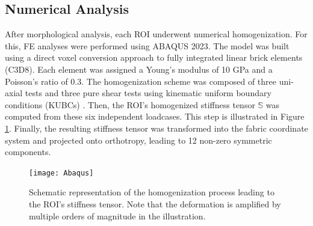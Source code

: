 \documentclass[a4paper,fleqn]{DC_ArtStyle}
\begin{document}
	\subsection{Numerical Analysis}
	After morphological analysis, each ROI underwent numerical homogenization.
	For this, \textmu FE analyses were performed using ABAQUS 2023.
	The model was built using a direct voxel conversion approach to fully integrated linear brick elements (C3D8).
	Each element was assigned a Young's modulus of 10 GPa and a Poisson's ratio of 0.3.
	The homogenization scheme was composed of three uni-axial tests and three pure shear tests using kinematic uniform boundary conditions (KUBCs) \cite{Panyasantisuk2015}.
	Then, the ROI's homogenized stiffness tensor $\mathbb{S}$ was computed from these six independent loadcases.
	This step is illustrated in Figure \ref{FigHomogenization}.
	Finally, the resulting stiffness tensor was transformed into the fabric coordinate system and projected onto orthotropy, leading to 12 non-zero symmetric components.

	\begin{figure}
		\texttt{[image: Abaqus]}
		\caption{Schematic representation of the homogenization process leading to the ROI's stiffness tensor.
				 Note that the deformation is amplified by multiple orders of magnitude in the illustration.}
		\label{FigHomogenization}
	\end{figure}
\end{document}
